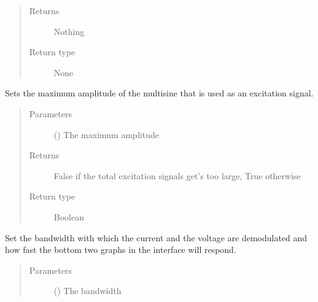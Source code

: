 \documentclass[letterpaper,10pt,english]{sphinxmanual}
\begin{document}
\begin{fulllineitems}
\begin{fulllineitems}
\begin{quote}
\begin{description}
\item[{Returns}] \leavevmode
\sphinxAtStartPar
Nothing

\item[{Return type}] \leavevmode
\sphinxAtStartPar
None

\end{description}\end{quote}

\end{fulllineitems}


\begin{fulllineitems}
\label{\detokenize{index:TiePieLCR_settings.TiePieLCR_settings.set_amplitude}}
\sphinxAtStartPar
Sets the maximum amplitude of the multisine that is used as an excitation signal.
\begin{quote}\begin{description}
\item[{Parameters}] \leavevmode
\sphinxAtStartPar
{} () \textendash{} The maximum amplitude

\item[{Returns}] \leavevmode
\sphinxAtStartPar
False if the total excitation signals get’s too large, True otherwise

\item[{Return type}] \leavevmode
\sphinxAtStartPar
Boolean

\end{description}\end{quote}

\end{fulllineitems}


\begin{fulllineitems}
\label{\detokenize{index:TiePieLCR_settings.TiePieLCR_settings.set_demodulation_bandwidth}}
\sphinxAtStartPar
Set the bandwidth with which the current and the voltage are demodulated and how fast the bottom two graphs in the interface will respond.
\begin{quote}\begin{description}
\item[{Parameters}] \leavevmode
\sphinxAtStartPar
{} () \textendash{} The bandwidth


\end{description}
\end{quote}
\end{fulllineitems}
\end{fulllineitems}
\end{document}
